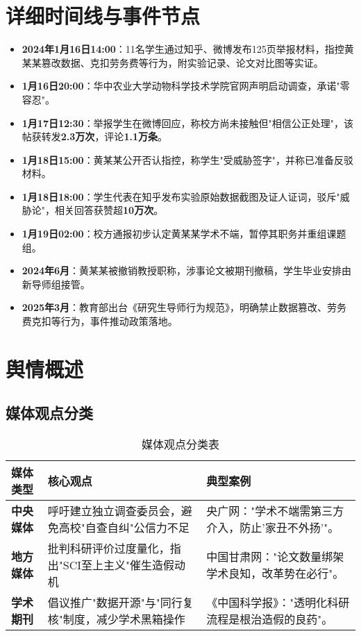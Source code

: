 \documentclass[12pt,a4paper]{article}
\begin{document}
\section{详细时间线与事件节点}
\begin{itemize}[leftmargin=*]
    \item \textbf{2024年1月16日14:00}：11名学生通过知乎、微博发布125页举报材料，指控黄某某篡改数据、克扣劳务费等行为，附实验记录、论文对比图等实证。
    \item \textbf{1月16日20:00}：华中农业大学动物科学技术学院官网声明启动调查，承诺"零容忍"。
    \item \textbf{1月17日12:30}：举报学生在微博回应，称校方尚未接触但"相信公正处理"，该帖获转发\textbf{2.3万次}，评论\textbf{1.1万条}。
    \item \textbf{1月18日15:00}：黄某某公开否认指控，称学生"受威胁签字"，并称已准备反驳材料。
    \item \textbf{1月18日18:00}：学生代表在知乎发布实验原始数据截图及证人证词，驳斥"威胁论"，相关回答获赞超\textbf{10万次}。
    \item \textbf{1月19日02:00}：校方通报初步认定黄某某学术不端，暂停其职务并重组课题组。
    \item \textbf{2024年6月}：黄某某被撤销教授职称，涉事论文被期刊撤稿，学生毕业安排由新导师组接管。
    \item \textbf{2025年3月}：教育部出台《研究生导师行为规范》，明确禁止数据篡改、劳务费克扣等行为，事件推动政策落地。
\end{itemize}

\section{舆情概述}
\subsection{媒体观点分类}
\begin{table}[H]
    \centering
    \begin{tabular}{|p{3cm}|p{6cm}|p{6cm}|}
        \hline
        \textbf{媒体类型} & \textbf{核心观点} & \textbf{典型案例} \\
        \hline
        \textbf{中央媒体} & 呼吁建立独立调查委员会，避免高校"自查自纠"公信力不足 & 央广网："学术不端需第三方介入，防止'家丑不外扬'"。 \\
        \hline
        \textbf{地方媒体} & 批判科研评价过度量化，指出"SCI至上主义"催生造假动机 & 中国甘肃网："论文数量绑架学术良知，改革势在必行"。 \\
        \hline
        \textbf{学术期刊} & 倡议推广"数据开源"与"同行复核"制度，减少学术黑箱操作 & 《中国科学报》："透明化科研流程是根治造假的良药"。 \\
        \hline
    \end{tabular}
    \caption{媒体观点分类表}
\end{table}
\end{document}
